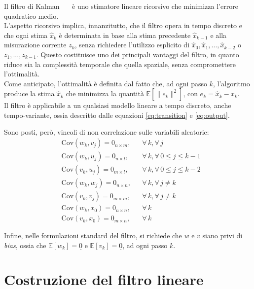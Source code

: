 \documentclass[12pt,a4paper,openright,twoside]{book}
\begin{document}
Il filtro di Kalman~\cite{10.1115/1.3662552}~\cite{WelchB95}~\cite{10.1145/3363294} è uno stimatore lineare ricorsivo che minimizza l'errore quadratico medio. \\
L'aspetto ricorsivo implica, innanzitutto, che il filtro opera in tempo discreto e che ogni stima $\hat{x}_k$ è determinata in base alla stima precedente $\hat{x}_{k-1}$ e alla misurazione corrente $z_k$, senza richiedere l'utilizzo esplicito di $\hat{x}_0,\hat{x}_1,...,\hat{x}_{k-2}$ o $z_1,...,z_{k-1}$. Questo costituisce uno dei principali vantaggi del filtro, in quanto riduce sia la complessità temporale che quella spaziale, senza compromettere l'ottimalità. \\
Come anticipato, l'ottimalità è definita dal fatto che, ad ogni passo $k$, l'algoritmo produce la stima $\hat{x}_k$ che minimizza la quantità $\mathbb{E}[\lVert e_k\rVert^2]$, con $e_k=\hat{x}_k-x_k$. \\

Il filtro è applicabile a un qualsiasi modello lineare a tempo discreto, anche tempo-variante, ossia descritto dalle equazioni \ref{eq:transition} e \ref{eq:output}.

Sono posti, però, vincoli di non correlazione sulle variabili aleatorie:
\begin{align*}
& \mathrm{Cov}(w_k,v_j)=0_{n\times m}, && \forall\,k,\forall\,j \\
& \mathrm{Cov}(w_k,u_j)=0_{n\times l}, && \forall\,k,\forall\,0\leq j\leq k-1 \\
& \mathrm{Cov}(v_k,u_j)=0_{m\times l}, && \forall\,k,\forall\,0\leq j\leq k-2 \\
& \mathrm{Cov}(w_k,w_j)=0_{n\times n}, && \forall\,k,\forall\,j\neq k \\
& \mathrm{Cov}(v_k,v_j)=0_{m\times m}, && \forall\,k,\forall\,j\neq k \\
& \mathrm{Cov}(w_k,x_0)=0_{n\times n}, && \forall\,k \\
& \mathrm{Cov}(v_k,x_0)=0_{m\times n}, && \forall\,k
\end{align*}

Infine, nelle formulazioni standard del filtro, si richiede che $w$ e $v$ siano privi di \textit{bias}, ossia che $\mathbb{E}[w_k]=\underline{0}$ e $\mathbb{E}[v_k]=\underline{0}$, ad ogni passo $k$.

\section{Costruzione del filtro lineare}
\end{document}
